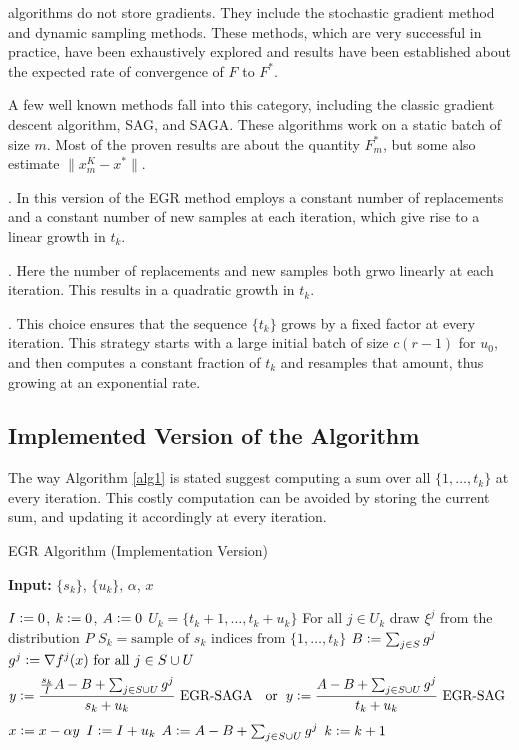 \documentclass[11pt]{article}
\newcommand{\defeqq}{\vcentcolon=}
\begin{document}
 algorithms do not store gradients. They include the stochastic gradient method and dynamic sampling methods. These methods, which are very successful in practice, have been exhaustively explored and results have been established about the expected rate of convergence of $F$ to $F^*$.

\medskip{} A few well known methods fall into this category, including the classic gradient descent algorithm, SAG, and  SAGA. These algorithms work on a static batch of size $m$. Most of the proven results are about the quantity $F^*_m$, but some also estimate $\|  x^K_m - x^*\|$.

\medskip{}. In this version of the EGR method employs a constant number of replacements and a constant number of new samples at each iteration, which give rise to a linear growth in $t_k$.

\medskip{}. Here the number of replacements and new samples both grwo linearly at each iteration. This results in a  quadratic growth in $t_k$.

\medskip{}. This choice ensures that the sequence $\{ t_k \}$ grows by a fixed factor at every iteration. This strategy starts with a large initial batch of size $c(r-1)$ for $u_0$, and then computes a constant fraction of $t_k$ and resamples that amount, thus growing at an exponential rate. 
 
\subsection{Implemented Version of the Algorithm}

The way Algorithm \ref{alg1} is stated suggest computing a sum over all $\{1, \ldots ,t_k \} $ at every iteration. This costly computation can be avoided by storing the current sum, and updating it accordingly at every iteration. 

  \bigskip
  \begin{algorithm}
  	[H] 
  	\caption{EGR Algorithm (Implementation Version)}
  	\label{alg1-IMP}
  	{\bf Input:} $\{ s_k\} $, $\{ u_k \}$, $\alpha$, $x$
  	\begin{algorithmic}
  		[1] 
  		\State $I \defeqq 0$, $k \defeqq 0$, $A \defeqq 0$
  		\Loop 
  		\State $U_k =\{t_{k}+1,\ldots, t_{k}+u_k \}$ 
  		\State For  all $j \in U_k$ draw $\xi^j$ from the distribution $P$ 
  		\State $S_k = \mbox{sample of } s_k \mbox{ indices from }\{ 1, \ldots ,t_{k}\}$ 
  		\State $B \defeqq \sum_{j \in S} g^j$ 
  		\State $g^j \defeqq  \nabla f^j(x) \mbox{ for all } j \in S\cup U$ 
  		\State 
  		\begin{equation}
  			y \defeqq  \frac{\frac{s_k}{I} A - B +\sum_{j \in S\cup U}g^j}{s_k+u_k} \mbox{ EGR-SAGA } \; \mbox{ or } \; y \defeqq  \frac{A - B +\sum_{j \in S\cup U}g^j}{t_k+u_k} \mbox{ EGR-SAG } 
  		\end{equation}
  		\State $x  \defeqq  x - \alpha y$ 
  		\State $I  \defeqq  I +u_k$ 
  		\State $A  \defeqq  A - B+ \sum_{j \in S\cup U}g^j$ 
  		\State $k \defeqq k+1$ 
  		\EndLoop 
  	\end{algorithmic}
  \end{algorithm}
  
\end{document}
